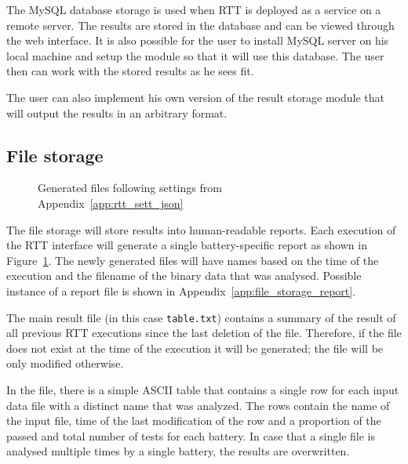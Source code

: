 \documentclass[
	digital,    %
	oneside,
	color,
	11pt,
	nocover,
	notable,
	nolof,
	nolot,
]{fithesis3}
\theoremstyle{definition}
\theoremstyle{remark}
\begin{document}
The MySQL database storage is used when RTT is deployed as a service on a remote server. The results are stored in the database and can be viewed through the web interface. It is also possible for the user to install MySQL server on his local machine and setup the module so that it will use this database. The user then can work with the stored results as he sees fit.

The user can also implement his own version of the result storage module that will output the results in an arbitrary format. 

\subsection{File storage}
\label{sec:file_res_storage}
\begin{figure}[h!]
\centering
{}
\caption{Generated files following settings from Appendix~\ref{app:rtt_sett_json}}
\label{fig:files_generated}
\end{figure}

\noindent
The file storage will store results into human-readable reports. Each execution of the RTT interface will generate a single battery-specific report as shown in Figure~\ref{fig:files_generated}. The newly generated files will have names based on the time of the execution and the filename of the binary data that was analysed. Possible instance of a report file is shown in Appendix~\ref{app:file_storage_report}.

The main result file (in this case \texttt{table.txt}) contains a summary of the result of all previous RTT executions since the last deletion of the file. Therefore, if the file does not exist at the time of the execution it will be generated; the file will be only modified otherwise.

In the file, there is a simple ASCII table that contains a single row for each input data file with a distinct name that was analyzed. The rows contain the name of the input file, time of the last modification of the row and a proportion of the passed and total number of tests for each battery. In case that a single file is analysed multiple times by a single battery, the results are overwritten.
\end{document}

